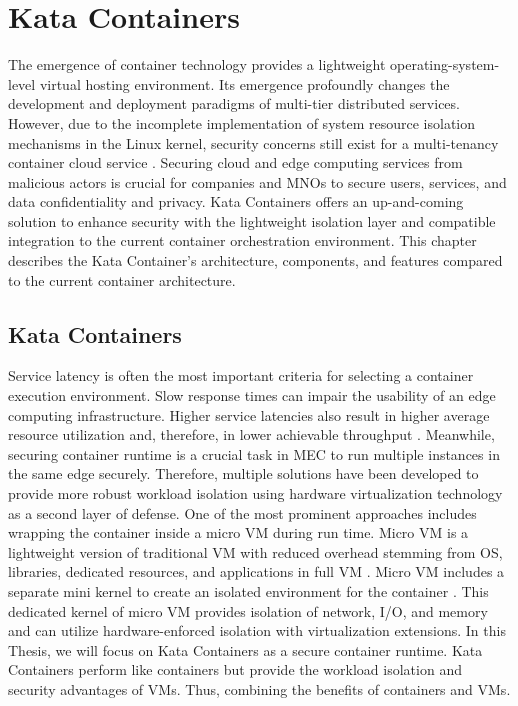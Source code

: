 \chapter{Kata Containers}
\label{chapter:katacontainers}

The emergence of container technology provides a lightweight operating-system-level virtual hosting environment. Its emergence profoundly changes the development and deployment paradigms of multi-tier distributed services. However, due to the incomplete implementation of system resource isolation mechanisms in the Linux kernel, security concerns still exist for a multi-tenancy container cloud service \cite{Gao2017}. Securing cloud and edge computing services from malicious actors is crucial for companies and MNOs to secure users, services, and data confidentiality and privacy. Kata Containers offers an up-and-coming solution to enhance security with the lightweight isolation layer and compatible integration to the current container orchestration environment. This chapter describes the Kata Container's architecture, components, and features compared to the current container architecture.

\section{Kata Containers}

Service latency is often the most important criteria for selecting a container execution environment. Slow response times can impair the usability of an edge computing infrastructure. Higher service latencies also result in higher average resource utilization and, therefore, in lower achievable throughput \cite{EverartsdeVelp2020}. Meanwhile, securing container runtime is a crucial task in MEC to run multiple instances in the same edge securely. Therefore, multiple solutions have been developed to provide more robust workload isolation using hardware virtualization technology as a second layer of defense. One of the most prominent approaches includes wrapping the container inside a micro VM during run time. Micro VM is a lightweight version of traditional VM with reduced overhead stemming from OS, libraries, dedicated resources, and applications in full VM \cite{Flauzac2020}. Micro VM includes a separate mini kernel to create an isolated environment for the container \cite{Kumar2020}. This dedicated kernel of micro VM provides isolation of network, I/O, and memory and can utilize hardware-enforced isolation with virtualization extensions. In this Thesis, we will focus on Kata Containers as a secure container runtime. Kata Containers perform like containers but provide the workload isolation and security advantages of VMs. Thus, combining the benefits of containers and VMs. \cite{KataContainers}

